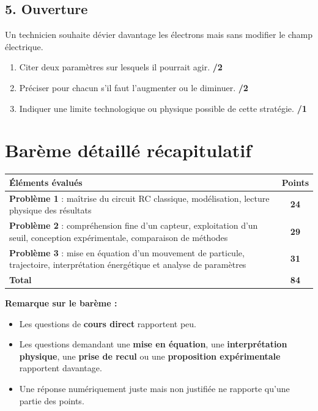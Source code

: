 \documentclass[11pt,a4paper]{article}
\begin{document}
\subsection*{5. Ouverture}
Un technicien souhaite dévier davantage les électrons mais sans modifier le champ électrique.

\begin{enumerate}
    \item Citer deux paramètres sur lesquels il pourrait agir. \hfill \textbf{/2}
    \item Préciser pour chacun s'il faut l'augmenter ou le diminuer. \hfill \textbf{/2}
    \item Indiquer une limite technologique ou physique possible de cette stratégie. \hfill \textbf{/1}
\end{enumerate}

\vspace{1em}

\section*{Barème détaillé récapitulatif}

\renewcommand{\arraystretch}{1.25}
\begin{tabularx}{\linewidth}{|Y|c|}
\hline
\textbf{Éléments évalués} & \textbf{Points} \\
\hline
\textbf{Problème 1} : maîtrise du circuit RC classique, modélisation, lecture physique des résultats & \textbf{24} \\
\hline
\textbf{Problème 2} : compréhension fine d'un capteur, exploitation d'un seuil, conception expérimentale, comparaison de méthodes & \textbf{29} \\
\hline
\textbf{Problème 3} : mise en équation d'un mouvement de particule, trajectoire, interprétation énergétique et analyse de paramètres & \textbf{31} \\
\hline
\textbf{Total} & \textbf{84} \\
\hline
\end{tabularx}

\vspace{1em}

\noindent\textbf{Remarque sur le barème :}
\begin{itemize}
    \item Les questions de \textbf{cours direct} rapportent peu.
    \item Les questions demandant une \textbf{mise en équation}, une \textbf{interprétation physique}, une \textbf{prise de recul} ou une \textbf{proposition expérimentale} rapportent davantage.
    \item Une réponse numériquement juste mais non justifiée ne rapporte qu'une partie des points.
\end{itemize}

\vspace{1em}

\begin{center}
\end{center}
\end{document}
